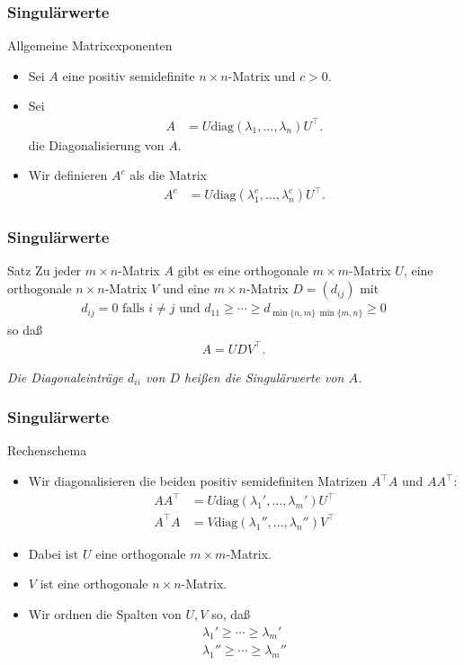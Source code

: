 \documentclass{beamer}
\renewcommand{\emph}[1]{{\textcolor{solarizedRed}{\itshape #1}}}
\newcommand{\diag}{\mathrm{diag}}
\newcommand{\trans}{\top}
\renewcommand{\ae}{\"a}
\newcommand{\mytitle}{Singul\ae rwerte}
\begin{document}
\begin{frame}\frametitle{\mytitle}
	\begin{block}{Allgemeine Matrixexponenten}
	\begin{itemize}
		\item Sei $A$ eine positiv semidefinite $n\times n$-Matrix und $c>0$.
		\item Sei 
\begin{align*}
				A&=U\diag(\lambda_1,\ldots,\lambda_n)U^\trans.
			\end{align*}
			die Diagonalisierung von $A$.
		\item Wir definieren $A^c$ als die Matrix
\begin{align*}
				A^c&=U\diag(\lambda_1^c,\ldots,\lambda_n^c)U^\trans.
			\end{align*}
	\end{itemize}
	\end{block}
\end{frame}

\begin{frame}\frametitle{\mytitle}
	\begin{block}{Satz}
		Zu jeder $m\times n$-Matrix $A$ gibt es eine orthogonale $m\times m$-Matrix $U$, eine orthogonale $n\times n$-Matrix $V$ und eine $m\times n$-Matrix $D=(d_{ij})$ mit
		\begin{align*}
			d_{ij}=0\mbox{ falls }i\neq j\mbox{ und }d_{11}\geq\cdots\geq d_{\min\{n,m\}\,\min\{m,n\}}\geq0
		\end{align*}
		so da\ss\ 
	\begin{align*}
		A=UDV^\trans.
	\end{align*}
	\end{block}
	{\itshape Die Diagonaleintr\ae ge $d_{ii}$ von $D$ hei\ss en die \emph{Singul\ae rwerte} von $A$.}
\end{frame}

\begin{frame}\frametitle{\mytitle}
	\begin{block}{Rechenschema}
	\begin{itemize}
	\item Wir diagonalisieren die beiden positiv semidefiniten Matrizen $A^\trans A$ und $AA^\trans$:
		\begin{align*}
			AA^\trans&=U \diag(\lambda_1',\ldots,\lambda_m') U^\trans\\
			A^\trans A&=V \diag(\lambda_1'',\ldots,\lambda_n'') V^\trans
		\end{align*}
	\item Dabei ist $U$ eine orthogonale $m\times m$-Matrix.
	\item $V$ ist eine orthogonale $n\times n$-Matrix.
	\item Wir ordnen die Spalten von $U,V$ so, da\ss\ 
		\begin{align*}
		\lambda_1'\geq\cdots\geq\lambda_m'\\
		\lambda_1''\geq\cdots\geq\lambda_m''
		\end{align*}
	\end{itemize}
	\end{block}
\end{frame}
\end{document}
